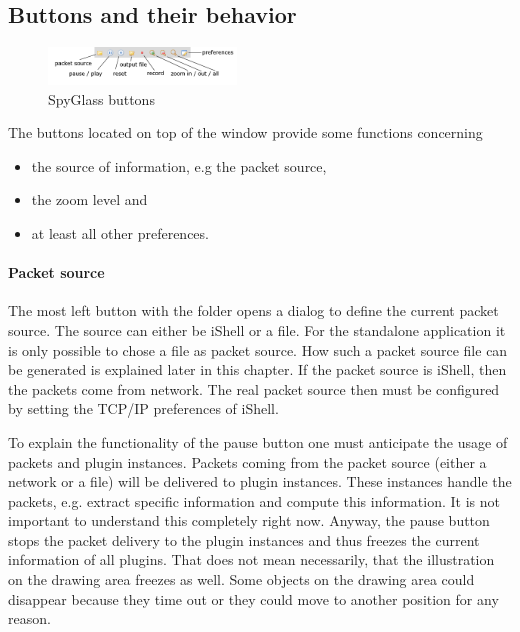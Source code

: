 \subsection{Buttons and their behavior}

\begin{figure}[htb]
  \begin{center}
    \includegraphics[width=5cm]{./pics/spyglass_buttons}
    \caption{SpyGlass buttons}
    \label{pic:spyglass_buttons}
  \end{center}
\end{figure}

The buttons located on top of the window provide some functions concerning
\begin{itemize}
  \item{the source of information, e.g the packet source,}
  \item{the zoom level and}
  \item{at least all other preferences}.
\end{itemize}

\paragraph{Packet source}

The most left button with the folder opens a dialog to define the current packet source. The source can either be iShell or
a file. For the standalone application it is only possible to chose a file as packet source. How such a packet source file
can be generated is explained later in this chapter. If the packet source is iShell, then the packets come from network.
The real packet source then must be configured by setting the TCP/IP preferences of iShell.

To explain the functionality of the pause button one must anticipate the usage of packets and plugin instances. Packets
coming from the packet source (either a network or a file) will be delivered to plugin instances. These instances
handle the packets, e.g. extract specific information and compute this information. It is not important to understand
this completely right now. Anyway, the pause button stops the packet delivery to the plugin instances and thus
freezes the current information of all plugins. That does not mean necessarily, that the illustration on the drawing area
freezes as well. Some objects on the drawing area could disappear because they time out or they could move to another
position for any reason.

